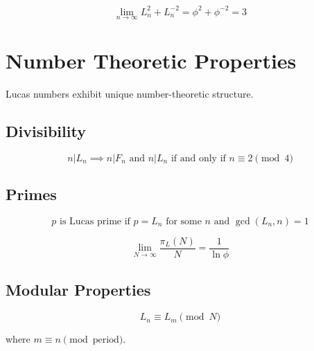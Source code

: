 \begin{theorem}
\label{thm:lucas-trinity}
\begin{equation}
\lim_{n\to\infty} L_n^2 + L_n^{-2} = \phi^2 + \phi^{-2} = 3
\end{equation}
\end{theorem}

\section{Number Theoretic Properties}

Lucas numbers exhibit unique number-theoretic structure.

\subsection{Divisibility}

\begin{theorem}
\label{fa_29:thm:lucas-div}
\begin{equation}
n | L_n \implies n | F_n \text{ and } n | L_n \text{ if and only if } n \equiv 2 \pmod{4}
\end{equation}
\end{theorem}

\subsection{Primes}

\begin{definition}
\label{fa_29:def:lucas-primes}
\begin{equation}
p \text{ is Lucas prime if } p = L_n \text{ for some } n \text{ and } \gcd(L_n, n) = 1
\end{equation}
\end{definition}

\begin{theorem}
\label{fa_29:thm:lucas-prime-density}
\begin{equation}
\lim_{N\to\infty} \frac{\pi_L(N)}{N} = \frac{1}{\ln\phi}
\end{equation}
\end{theorem}

\subsection{Modular Properties}

\begin{proposition}
\label{fa_29:prop:lucas-mod}
\begin{equation}
L_n \equiv L_m \pmod{N}
\end{equation}

where $m \equiv n \pmod{\text{period}}$.
\end{proposition}


